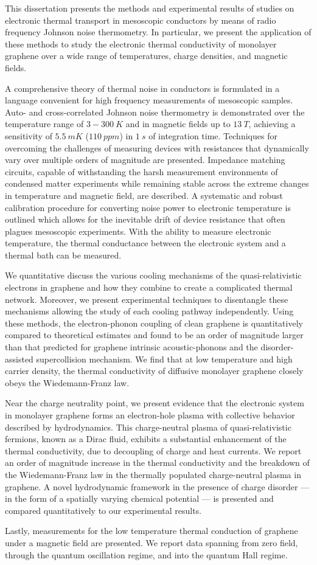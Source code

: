 This dissertation presents the methods and experimental results of studies on electronic thermal transport in mesoscopic conductors by means of radio frequency Johnson noise thermometry. In particular, we present the application of these methods to study the electronic thermal conductivity of monolayer graphene over a wide range of temperatures, charge densities, and magnetic fields.

A comprehensive theory of thermal noise in conductors is formulated in a language convenient for high frequency measurements of mesoscopic samples. Auto- and cross-correlated Johnson noise thermometry is demonstrated over the temperature range of $3-300~K$ and in magnetic fields up to $13~T$, achieving a sensitivity of $5.5~mK$ ($110~ppm$) in $1~s$ of integration time. Techniques for overcoming the challenges of measuring devices with resistances that dynamically vary over multiple orders of magnitude are presented. Impedance matching circuits, capable of withstanding the harsh measurement environments of condensed matter experiments while remaining stable across the extreme changes in temperature and magnetic field, are described. A systematic and robust calibration procedure for converting noise power to electronic temperature is outlined which allows for the inevitable drift of device resistance that often plagues mesoscopic experiments. With the ability to measure electronic temperature, the thermal conductance between the electronic system and a thermal bath can be measured. 

We quantitative discuss the various cooling mechanisms of the quasi-relativistic electrons in graphene and how they combine to create a complicated thermal network. Moreover, we present experimental techniques to disentangle these mechanisms allowing the study of each cooling pathway independently. Using these methods, the electron-phonon coupling of clean graphene is quantitatively compared to theoretical estimates and found to be an order of magnitude larger than that predicted for graphene intrinsic acoustic-phonons and the disorder-assisted supercollision mechanism. We find that at low temperature and high carrier density, the thermal conductivity of diffusive monolayer graphene closely obeys the Wiedemann-Franz law. 

Near the charge neutrality point, we present evidence that the electronic system in monolayer graphene forms an electron-hole plasma with collective behavior described by hydrodynamics. This charge-neutral plasma of quasi-relativistic fermions, known as a Dirac fluid, exhibits a substantial enhancement of the thermal conductivity, due to decoupling of charge and heat currents. We report an order of magnitude increase in the thermal conductivity and the breakdown of the Wiedemann-Franz law in the thermally populated charge-neutral plasma in graphene. A novel hydrodynamic framework in the presence of charge disorder --- in the form of a spatially varying chemical potential --- is presented and compared quantitatively to our experimental results.

Lastly, measurements for the low temperature thermal conduction of graphene under a magnetic field are presented. We report data spanning from zero field, through the quantum oscillation regime, and into the quantum Hall regime.